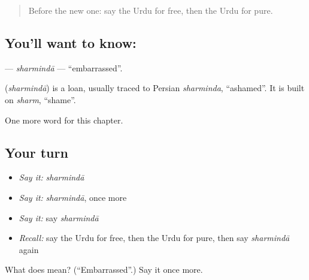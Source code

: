 \label{lesson:UR-C163-sharminda}



\begin{quote}
Before the new one: say the Urdu for free, then the Urdu for pure.
\end{quote}

\subsection*{You'll want to know: }
\textbf{} — \emph{sharmindā} — \textquotedblleft{}embarrassed\textquotedblright{}.

\begin{cousinweb}
\textbf{} (\emph{sharmindā}) is a loan, usually traced to Persian \emph{sharminda}, \textquotedblleft{}ashamed\textquotedblright{}. It is built on \emph{sharm}, \textquotedblleft{}shame\textquotedblright{}.
\end{cousinweb}

\begin{grammarlens}[title={What you've built}]
One more word for this chapter.
\end{grammarlens}

\subsection*{Your turn}
\begin{itemize}
\raggedright
  \item \emph{Say it:} \emph{sharmindā}
  \item \emph{Say it:} \emph{sharmindā}, once more
  \item \emph{Say it:} say \emph{sharmindā}
  \item \emph{Recall:} say the Urdu for free, then the Urdu for pure, then say \emph{sharmindā} again
\end{itemize}

\begin{tcolorbox}[breakable,colback=teal!4,colframe=teal!35!black,title={Before you move on}]
What does  mean? (\textquotedblleft{}Embarrassed\textquotedblright{}.) Say it once more.
\end{tcolorbox}
